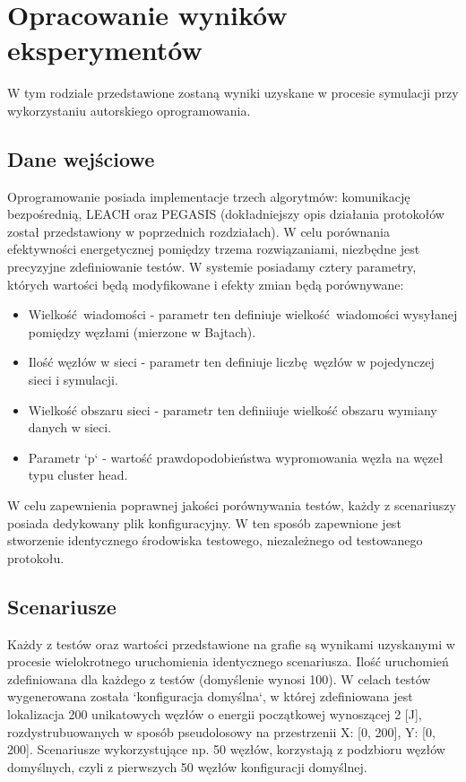 \documentclass[a4paper,12pt,twoside,openany]{report}
\begin{document}
\chapter{Opracowanie wyników eksperymentów}

W tym rodziale przedstawione zostaną wyniki uzyskane w procesie symulacji przy wykorzystaniu autorskiego oprogramowania.

\section{Dane wejściowe}

Oprogramowanie posiada implementacje trzech algorytmów: komunikację bezpośrednią, LEACH oraz PEGASIS (dokładniejszy opis działania protokołów został przedstawiony w poprzednich rozdziałach).
W celu porównania efektywności energetycznej pomiędzy trzema rozwiązaniami, niezbędne jest precyzyjne zdefiniowanie testów.
W systemie posiadamy cztery parametry, których wartości będą modyfikowane i efekty zmian będą porównywane:

\begin{itemize}
 \item Wielkość wiadomości - parametr ten definiuje wielkość wiadomości wysyłanej pomiędzy węzłami (mierzone w Bajtach).
 \item Ilość węzłów w sieci - parametr ten definiuje liczbę węzłów w pojedynczej sieci i symulacji.
 \item Wielkość obszaru sieci - parametr ten definiiuje wielkość obszaru wymiany danych w sieci.
 \item Parametr `p` - wartość prawdopodobieństwa wypromowania węzła na węzeł typu cluster head.
\end{itemize}

W celu zapewnienia poprawnej jakości porównywania testów, każdy z scenariuszy posiada dedykowany plik konfiguracyjny.
W ten sposób zapewnione jest stworzenie identycznego środowiska testowego, niezależnego od testowanego protokołu.

\section{Scenariusze}

Każdy z testów oraz wartości przedstawione na grafie są wynikami uzyskanymi w procesie wielokrotnego uruchomienia identycznego scenariusza. 
Ilość uruchomień zdefiniowana dla każdego z testów (domyślenie wynosi 100).
W celach testów wygenerowana została `konfiguracja domyślna`, w której zdefiniowana jest lokalizacja 200 unikatowych węzłów o energii początkowej wynoszącej 2 [J], 
rozdystrubuowanych w sposób pseudolosowy na przestrzenii X: [0, 200], Y: [0, 200].
Scenariusze wykorzystujące np. 50 węzłów, korzystają z podzbioru węzłów domyślnych, czyli z pierwszych 50 węzłów konfiguracji domyślnej.
\end{document}
